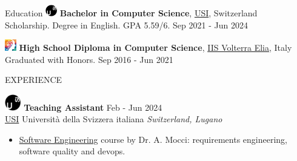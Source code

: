 \documentclass{cv} %
\def\intraexpvspace{0.15cm}
\begin{document}
\begin{minipage}[l]{0.7\linewidth}
\begin{rSection}{Education}
    \includegraphics[width=0.5cm, trim={0cm 5cm 0cm 0cm}]{usi-icon.png}
    {\bf Bachelor in Computer Science},
    \hfill \href{https://www.usi.ch/en}{USI}, Switzerland\\
    Scholarship. Degree in English. GPA 5.59/6. 
    \hfill {Sep 2021 - Jun 2024} 
    \vspace{\intraexpvspace}
    \vspace{\intraexpvspace}

    \includegraphics[width=0.5cm, trim={0cm 1cm 0cm 0cm}]{iisve-icon.png}
    {\bf High School Diploma in Computer Science},
    \hfill \href{https://www.istitutovolterraelia.it/}{IIS Volterra Elia}, Italy \\
    Graduated with Honors.
    \hfill {Sep 2016 - Jun 2021} 
\end{rSection}
\begin{rSection}{EXPERIENCE}
    \vspace{0.2cm}

    \includegraphics[width=0.7cm, trim={0cm 10cm 0cm 0cm}]{usi-icon.png}
    \hspace*{0cm}\textbf{Teaching Assistant} \hfill Feb - Jun 2024\\
    \hspace*{0.85cm}\href{https://www.usi.ch/}{USI} Università della Svizzera italiana
    \hfill \textit{Switzerland, Lugano}
    \begin{itemize}
        \item \href{https://search.usi.ch/it/corsi/35268192/software-atelier-4-software-engineering-project}{Software Engineering}
              course by Dr. A. Mocci: requirements engineering, software quality and devops.


\end{itemize}
\end{rSection}
\end{minipage}
\end{document}
